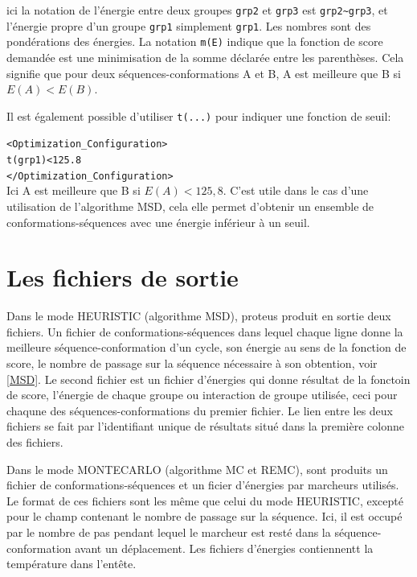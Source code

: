 \begin{enumerate}
ici la notation de l'énergie entre deux groupes \verb!grp2! et \verb!grp3! est \verb!grp2~grp3!, et  l'énergie propre d'un groupe \verb!grp1! simplement \verb!grp1!. Les nombres sont des pondérations des énergies. La notation \verb!m(E)! indique que la fonction de score demandée est une minimisation de la somme déclarée entre les parenthèses. Cela signifie que pour deux séquences-conformations A et B, A est meilleure que B si $E(A) < E(B)$.


Il est également possible d'utiliser \verb!t(...)! pour indiquer une fonction de seuil:

\verb!<Optimization_Configuration>! \\
\verb!t(grp1)<125.8! \\
\verb!</Optimization_Configuration>! \\

Ici A est meilleure que B si $E(A)<125,8$. C'est utile dans le cas d'une utilisation de l'algorithme MSD, cela elle permet d'obtenir un ensemble de conformations-séquences avec une énergie inférieur à un seuil.


\section{Les fichiers de sortie}
\label{proteusIO}
Dans le mode HEURISTIC (algorithme MSD), proteus produit en sortie deux fichiers. Un fichier de conformations-séquences dans lequel chaque ligne donne la meilleure séquence-conformation d'un cycle, son énergie au sens de la fonction de score, le nombre de passage sur la séquence nécessaire à son obtention, voir \ref{MSD}. Le second fichier est un fichier d'énergies qui donne résultat de la fonctoin de score, l'énergie de chaque groupe ou interaction de groupe utilisée, ceci pour chaqune des séquences-conformations du premier fichier. Le lien entre les deux fichiers se fait par l'identifiant unique de résultats situé dans la première colonne des fichiers.

Dans le mode MONTECARLO (algorithme MC et REMC), sont produits un fichier de conformations-séquences et un ficier d'énergies par marcheurs utilisés. Le format de ces fichiers sont les même que celui du mode HEURISTIC, excepté pour le champ contenant le nombre de passage sur la séquence. Ici, il est occupé par le nombre de pas pendant lequel le marcheur est resté dans la séquence-conformation avant un déplacement. Les fichiers d'énergies contiennentt la température dans l'entête.


\end{enumerate}
